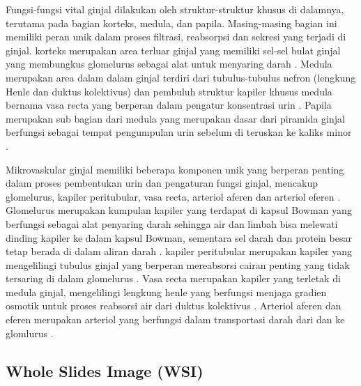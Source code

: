 \noindent Fungsi-fungsi vital ginjal dilakukan oleh struktur-struktur khusus di dalamnya, terutama pada bagian korteks, medula, dan papila. Masing-masing bagian ini memiliki peran unik dalam proses filtrasi, reabsorpsi dan sekresi yang terjadi di ginjal. korteks merupakan area terluar ginjal yang memiliki sel-sel bulat ginjal yang membungkus glomelurus sebagai alat untuk menyaring darah \cite{gopalan_renal_2022,mescher_junqueiras_2021}. Medula merupakan area dalam dalam ginjal terdiri dari tubulus-tubulus nefron (lengkung Henle dan duktus kolektivus) dan pembuluh struktur kapiler khusus medula bernama vasa recta yang berperan dalam pengatur konsentrasi urin \cite{haug_multi-omic_2022}. Papila merupakan sub bagian dari medula yang merupakan dasar dari piramida ginjal berfungsi sebagai tempat pengumpulan urin sebelum di teruskan ke kaliks minor \cite{sabate_arroyo_relationship_2020}.

\noindent Mikrovaskular ginjal memiliki beberapa komponen unik yang berperan penting dalam proses pembentukan urin dan pengaturan fungsi ginjal, mencakup glomelurus, kapiler peritubular, vasa recta, arteriol aferen dan arteriol eferen \cite{mescher_junqueiras_2021}. Glomelurus merupakan kumpulan kapiler yang terdapat di kapsul Bowman yang berfungsi sebagai alat penyaring darah sehingga air dan limbah bisa melewati dinding kapiler ke dalam kapsul Bowman, sementara sel darah dan protein besar tetap berada di dalam aliran darah \cite{luxen_unique_2023}. kapiler peritubular merupakan kapiler yang mengelilingi tubulus ginjal yang berperan mereabsorsi cairan penting yang tidak tersaring di dalam glomelurus \cite{savedchuk_targeting_2023}. Vasa recta merupakan kapiler yang terletak di medula ginjal, mengelilingi  lengkung henle yang berfungsi menjaga gradien osmotik untuk proses reabsorsi air dari duktus kolektivus \cite{goligorsky_emerging_2022}. Arteriol aferen dan eferen merupakan arteriol  yang berfungsi dalam transportasi darah dari dan ke glomlurus \cite{ergin_kidney_2021}.


\subsection{Whole Slides Image (WSI)}

